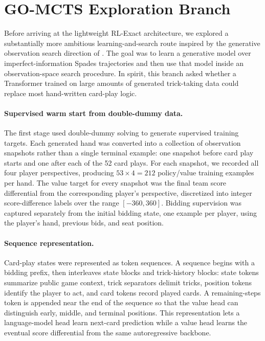 \documentclass{article}
\begin{document}
\section{GO-MCTS Exploration Branch}
\label{app:go-mcts-branch}

Before arriving at the lightweight RL-Exact architecture, we explored a substantially more ambitious learning-and-search route inspired by the generative observation search direction of \citet{gottwald2024transformer}. The goal was to learn a generative model over imperfect-information Spades trajectories and then use that model inside an observation-space search procedure. In spirit, this branch asked whether a Transformer trained on large amounts of generated trick-taking data could replace most hand-written card-play logic.

\paragraph{Supervised warm start from double-dummy data.}
The first stage used double-dummy solving to generate supervised training targets. Each generated hand was converted into a collection of observation snapshots rather than a single terminal example: one snapshot before card play starts and one after each of the 52 card plays. For each snapshot, we recorded all four player perspectives, producing $53 \times 4 = 212$ policy/value training examples per hand. The value target for every snapshot was the final team score differential from the corresponding player's perspective, discretized into integer score-difference labels over the range $[-360,360]$. Bidding supervision was captured separately from the initial bidding state, one example per player, using the player's hand, previous bids, and seat position.

\paragraph{Sequence representation.}
Card-play states were represented as token sequences. A sequence begins with a bidding prefix, then interleaves state blocks and trick-history blocks: state tokens summarize public game context, trick separators delimit tricks, position tokens identify the player to act, and card tokens record played cards. A remaining-steps token is appended near the end of the sequence so that the value head can distinguish early, middle, and terminal positions. This representation lets a language-model head learn next-card prediction while a value head learns the eventual score differential from the same autoregressive backbone.
\end{document}
